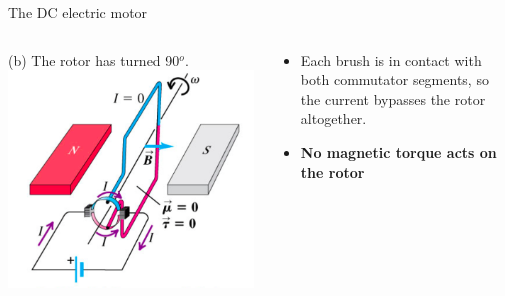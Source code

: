 \begin{frame}{The DC electric motor}

\begin{columns}
  \begin{column}{0.50\textwidth}
    \begin{center}
     (b) The rotor has turned 90$^{o}$.\\
     \vspace{0.3cm}
     \includegraphics[width=0.99\textwidth]{./images/schematics/electric_motor_dc_operation_b.png}\\
    \end{center}
  \end{column}
  \begin{column}{0.50\textwidth}
  {\small
      \begin{itemize}
           \item Each brush is in contact with both commutator segments,
                     so the current bypasses the rotor altogether.
           \item {\bf No magnetic torque acts on the rotor}
      \end{itemize}
  }
  \end{column}
\end{columns}

\end{frame}

%
%
%

